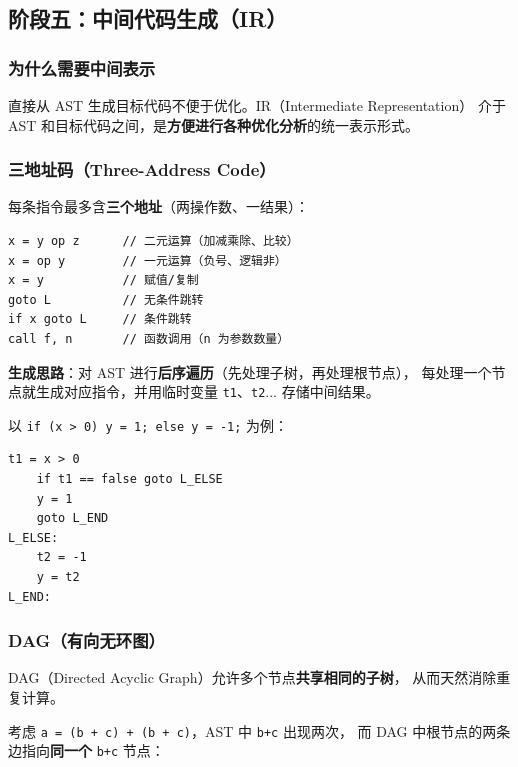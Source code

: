 \documentclass[12pt, a4paper]{ctexart}
\begin{document}
\subsection{阶段五：中间代码生成（IR）}

\subsubsection{为什么需要中间表示}

直接从 AST 生成目标代码不便于优化。IR（Intermediate Representation）
介于 AST 和目标代码之间，是\textbf{方便进行各种优化分析}的统一表示形式。

\subsubsection{三地址码（Three-Address Code）}

每条指令最多含\textbf{三个地址}（两操作数、一结果）：

\begin{lstlisting}[caption={三地址码指令类型示例}]
x = y op z      // 二元运算（加减乘除、比较）
x = op y        // 一元运算（负号、逻辑非）
x = y           // 赋值/复制
goto L          // 无条件跳转
if x goto L     // 条件跳转
call f, n       // 函数调用（n 为参数数量）
\end{lstlisting}

\textbf{生成思路}：对 AST 进行\textbf{后序遍历}（先处理子树，再处理根节点），
每处理一个节点就生成对应指令，并用临时变量 \texttt{t1}、\texttt{t2}...
存储中间结果。

以 \texttt{if (x > 0) y = 1; else y = -1;} 为例：

\begin{lstlisting}[caption={if-else 语句的三地址码生成示例}]
    t1 = x > 0
    if t1 == false goto L_ELSE
    y = 1
    goto L_END
L_ELSE:
    t2 = -1
    y = t2
L_END:
\end{lstlisting}

\subsubsection{DAG（有向无环图）}

DAG（Directed Acyclic Graph）允许多个节点\textbf{共享相同的子树}，
从而天然消除重复计算。

考虑 \texttt{a = (b + c) + (b + c)}，AST 中 \texttt{b+c} 出现两次，
而 DAG 中根节点的两条边指向\textbf{同一个} \texttt{b+c} 节点：
\end{document}
